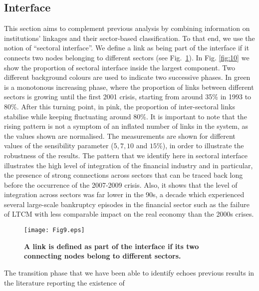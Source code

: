 \documentclass[a4paper,10pt]{article}
\begin{document}
\subsection{Interface}
This section aims to complement previous analysis by combining information on institutions' linkages and their sector-based
classification. To that end, we use the notion of \textquotedblleft sectoral interface\textquotedblright. We define a link as
being part of the interface if it connects two nodes belonging to different sectors (see Fig.~\ref{fig:9}). In Fig. 
\ref{fig:10} we show the proportion of sectoral interface inside the largest component. Two different background colours are 
used to indicate two successive phases. In green is a monotonous increasing phase, where the proportion of links between 
different sectors is growing until the first 2001 crisis, starting from around 35\% in 1993 to 80\%. After this turning point,
in pink, the proportion of inter-sectoral links stabilise while keeping fluctuating around $80\%$. It is important to note 
that the rising pattern is not a symptom of an inflated number of links in the system, as the values shown are normalised. 
The measurements are shown for different values of the sensibility parameter ($5,7,10 $ and $15 \% $), in order to illustrate 
the robustness of the results. The pattern that we identify here in sectoral interface illustrates the high level of 
integration of the financial industry and in particular, the presence of strong connections across sectors that can be 
traced back long before the occurrence of the 2007-2009 crisis. Also, it shows that the level of integration across sectors
was far lower in the 90s, a decade which experienced several large-scale bankruptcy episodes in the financial sector such as 
the failure of LTCM with less comparable impact on the real economy than the 2000s crises. 
\begin{figure}[!h]
\begin{center}
\texttt{[image: Fig9.eps]}
\end{center}
\caption{{\bf A link is defined as part of the interface if its two connecting nodes belong to different sectors.}}
\label{fig:9}
\end{figure}
The transition phase that we have been able to identify echoes previous results in the literature reporting the existence of 
\end{document}
